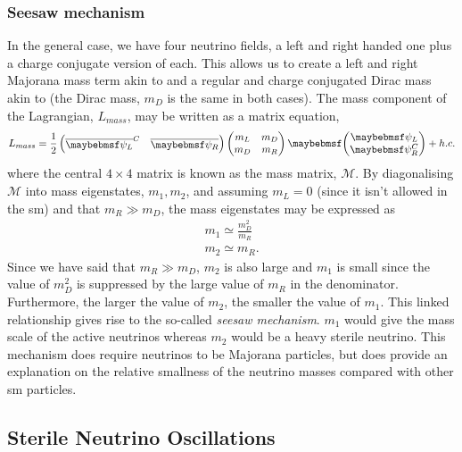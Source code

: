 \subsubsection{Seesaw mechanism}\label{sec:seesaw_mechanism}
In the general case, we have four neutrino fields, a left and right handed one plus a charge conjugate version of each. This allows us to create a left and right Majorana mass term akin to  and a regular and charge conjugated Dirac mass akin to  (the Dirac mass, $m_D$ is the same in both cases). The mass component of the Lagrangian, $L_{mass}$, may be written as a matrix equation, 
\begin{equation}
    L_{mass} = \frac{1}{2} 
    \begin{pmatrix}
    \overline{\psi_L}^C & \overline{\psi_R}
    \end{pmatrix}
    \begin{pmatrix}
    m_L & m_D \\
    m_D & m_R
    \end{pmatrix}
    \twomatrix {\psi_L} {\psi_R^C} + h.c.
\end{equation}
where the central $4 \times 4$ matrix is known as the mass matrix, $\mathcal{M}$. By diagonalising $\mathcal{M}$ into mass eigenstates, $m_1, m_2$, and assuming $m_L = 0$ (since it isn't allowed in the \gls{sm}) and that $m_R \gg m_D$, the mass eigenstates may be expressed as
\begin{equation}
\begin{split}
    m_1 \simeq \frac{m_D^2}{m_R} \\
    m_2 \simeq m_R.
\end{split}
\end{equation}
Since we have said that $m_R \gg m_D$, $m_2$ is also large and $m_1$ is small since the value of $m_D^2$ is suppressed by the large value of $m_R$ in the denominator. Furthermore, the larger the value of $m_2$, the smaller the value of $m_1$. This linked relationship gives rise to the so-called \textit{seesaw mechanism}. $m_1$ would give the mass scale of the active neutrinos whereas $m_2$ would be a heavy sterile neutrino. This mechanism does require neutrinos to be Majorana particles, but does provide an explanation on the relative smallness of the neutrino masses compared with other \gls{sm} particles. 


\subsection{Sterile Neutrino Oscillations}

